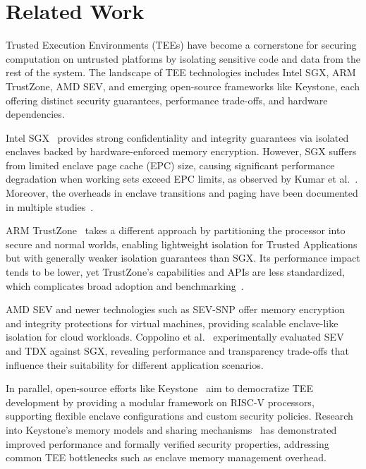 \section{Related Work}

Trusted Execution Environments (TEEs) have become a cornerstone for securing computation on untrusted platforms by isolating sensitive code and data from the rest of the system. The landscape of TEE technologies includes Intel SGX, ARM TrustZone, AMD SEV, and emerging open-source frameworks like Keystone, each offering distinct security guarantees, performance trade-offs, and hardware dependencies.

Intel SGX~\cite{akkram2020scientific, kumar2022sgxgauge} provides strong confidentiality and integrity guarantees via isolated enclaves backed by hardware-enforced memory encryption. However, SGX suffers from limited enclave page cache (EPC) size, causing significant performance degradation when working sets exceed EPC limits, as observed by Kumar et al.~\cite{kumar2022sgxgauge}. Moreover, the overheads in enclave transitions and paging have been documented in multiple studies~\cite{akkram2020scientific, krahn2020teemon}.

ARM TrustZone~\cite{suzaki2021ts, turn0search8} takes a different approach by partitioning the processor into secure and normal worlds, enabling lightweight isolation for Trusted Applications but with generally weaker isolation guarantees than SGX. Its performance impact tends to be lower, yet TrustZone’s capabilities and APIs are less standardized, which complicates broad adoption and benchmarking~\cite{turn0search9}.

AMD SEV and newer technologies such as SEV-SNP offer memory encryption and integrity protections for virtual machines, providing scalable enclave-like isolation for cloud workloads. Coppolino et al.~\cite{turn0search2_coppolino} experimentally evaluated SEV and TDX against SGX, revealing performance and transparency trade-offs that influence their suitability for different application scenarios.

In parallel, open-source efforts like Keystone~\cite{Lee2019, dayeol2019keystone} aim to democratize TEE development by providing a modular framework on RISC-V processors, supporting flexible enclave configurations and custom security policies. Research into Keystone’s memory models and sharing mechanisms~\cite{yu2022elasticlave, lee2022cerberus} has demonstrated improved performance and formally verified security properties, addressing common TEE bottlenecks such as enclave memory management overhead.

